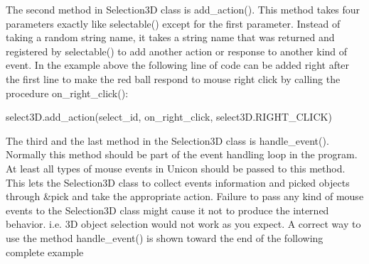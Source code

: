 \documentclass[letterpaper]{article}
\begin{document}
{\bigskip

The second method in Selection3D class is \textsf{add\_action()}. This
method takes four parameters exactly like \textsf{selectable()} except
for the first parameter. Instead of taking a random string name, it
takes a string name that was returned and registered by
\textsf{selectable()} to add another action or response to another
kind of event.  In the example above the following line of code can be
added right after the first line to make the red ball respond to mouse
right click by calling the procedure \textsf{on\_right\_click():}


\bigskip

{\sffamily
select3D.add\_action(select\_id, on\_right\_click, select3D.RIGHT\_CLICK)~~
}

The third and the last method in the Selection3D class is
\textsf{handle\_event()}. Normally this method should be part
of the event handling loop in the program. At least all types of mouse
events in Unicon should be passed to this method. This lets the
\textsf{Selection3D} class to collect events information and picked
objects through \textsf{\&pick} and take the appropriate
action. Failure to pass any kind of mouse events to the
\textsf{Selection3D} class might cause it not to produce the interned
behavior. i.e. 3D object selection would not work as you expect. A
correct way to use the method \textsf{handle\_event()} is
shown toward the end of the following complete example

}
\end{document}
